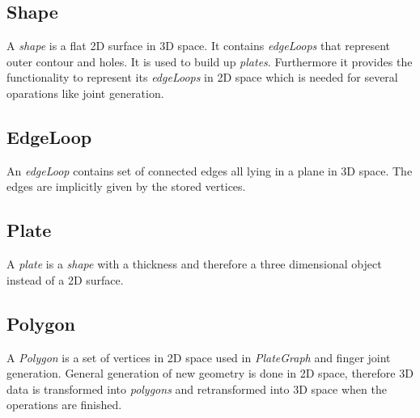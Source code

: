 \documentclass[../ClassicThesis.tex]{subfiles}
\begin{document}
\subsection*{Shape}

A \emph{shape} is a flat 2D surface in 3D space. It contains \emph{edgeLoops} that represent outer contour and holes. It is used to build up \emph{plates}. Furthermore it provides the functionality to represent its \emph{edgeLoops} in 2D space which is needed for several oparations like joint generation.

\subsection*{EdgeLoop}

An \emph{edgeLoop} contains set of connected edges all lying in a plane in 3D space. The edges are implicitly given by the stored vertices.

\subsection*{Plate}

A \emph{plate} is a \emph{shape} with a thickness and therefore a three dimensional object instead of a 2D surface.

\subsection*{Polygon}

A \emph{Polygon} is a set of vertices in 2D space used in \emph{PlateGraph} and finger joint generation. General generation of new geometry is done in 2D space, therefore 3D data is transformed into \emph{polygons} and retransformed into 3D space when the operations are finished.
\end{document}
